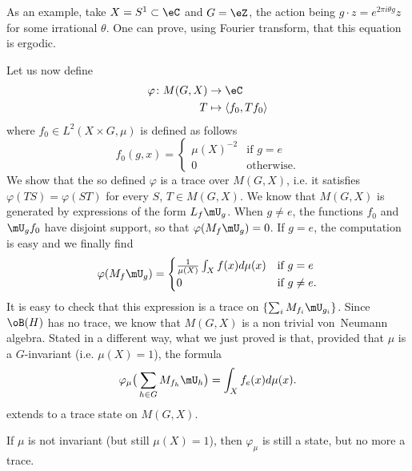As an example, take $X=S^1\subset \eC$ and $G=\eZ$, the action being $g\cdot z= e^{2\pi i\theta g}z$ for some irrational $\theta$. One can prove, using Fourier transform, that this equation is ergodic.

Let us now define
\begin{equation}
	\begin{aligned}
		\varphi\colon M(G,X) & \to \eC                          \\
		T                    & \mapsto \langle f_0, Tf_0\rangle
	\end{aligned}
\end{equation}
where $f_0\in  L^2(X\times G,\mu)$ is defined as follows
\[
	f_0(g,x)=
	\begin{cases}
		\mu(X)^{-2} & \text{if }g=e     \\
		0           & \text{otherwise.}
	\end{cases}
\]
We show that the so defined $\varphi$ is a trace over $M(G,X)$, i.e. it satisfies $\varphi(TS)=\varphi(ST)$ for every $S$, $T\in M(G,X)$. We know that $M(G,X)$ is generated by expressions of the form $L_f\mU_g$. When $g\neq e$, the functions $f_0$ and $\mU_gf_0$ have disjoint support, so that $\varphi(M_f\mU_g)=0$. If $g=e$, the computation is easy and we finally find
\begin{equation}
	\varphi(M_f\mU_g)=
	\begin{cases}
		\frac{1}{ \mu(X) }\int_X f(x)d\mu(x) & \text{if }g=e      \\
		0                                    & \text{if }g\neq e.
	\end{cases}
\end{equation}
It is easy to check that this expression is a trace on $\{ \sum_iM_{f_i}\mU_{g_i} \}$. Since $\oB(H)$ has no trace, we know that $M(G,X)$ is a non trivial von~Neumann algebra. Stated in a different way, what we just proved is that, provided that $\mu$ is a $G$-invariant  (i.e. $\mu(X)=1$), the formula
\begin{equation} 		\label{Eqvpmupickid}
	\varphi_{\mu}\big( \sum_{h\in G} M_{f_h}\mU_h \big)=\int_X f_e(x)d\mu(x).
\end{equation}
extends to a trace state on $M(G,X)$.

\begin{proposition}
	If $\mu$ is not invariant (but still $\mu(X)=1$), then $\varphi_{\mu}$ is still a state, but no more a trace.
\end{proposition}

